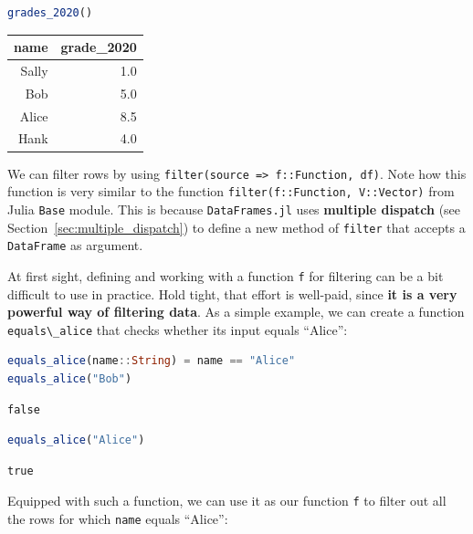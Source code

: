 \documentclass[
  notoc %
]{tufte-book}
\newcommand{\passthrough}[1]{#1}
\begin{document}
\begin{lstlisting}[language=Julia]
grades_2020()
\end{lstlisting}

\begin{longtable}[]{@{}rr@{}}
\toprule
name & grade\_2020 \\
\midrule
\endhead
Sally & 1.0 \\
Bob & 5.0 \\
Alice & 8.5 \\
Hank & 4.0 \\
\bottomrule
\end{longtable}

We can filter rows by using
\passthrough{\lstinline!filter(source => f::Function, df)!}. Note how
this function is very similar to the function
\passthrough{\lstinline!filter(f::Function, V::Vector)!} from Julia
\passthrough{\lstinline!Base!} module. This is because
\passthrough{\lstinline!DataFrames.jl!} uses \textbf{multiple dispatch}
(see Section~\ref{sec:multiple_dispatch}) to define a new method of
\passthrough{\lstinline!filter!} that accepts a
\passthrough{\lstinline!DataFrame!} as argument.

At first sight, defining and working with a function
\passthrough{\lstinline!f!} for filtering can be a bit difficult to use
in practice. Hold tight, that effort is well-paid, since \textbf{it is a
very powerful way of filtering data}. As a simple example, we can create
a function \passthrough{\lstinline!equals\_alice!} that checks whether
its input equals ``Alice'':

\begin{lstlisting}[language=Julia]
equals_alice(name::String) = name == "Alice"
equals_alice("Bob")
\end{lstlisting}

\begin{lstlisting}[language=Output]
false
\end{lstlisting}

\begin{lstlisting}[language=Julia]
equals_alice("Alice")
\end{lstlisting}

\begin{lstlisting}[language=Output]
true
\end{lstlisting}

Equipped with such a function, we can use it as our function
\passthrough{\lstinline!f!} to filter out all the rows for which
\passthrough{\lstinline!name!} equals ``Alice'':
\end{document}
